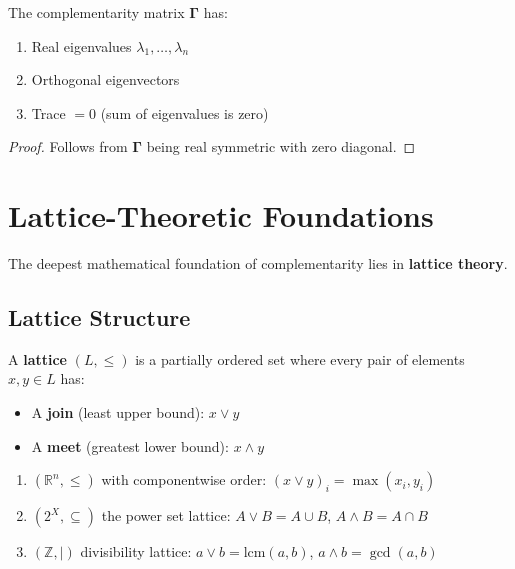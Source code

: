 \begin{theorem}
\label{thm:spectral}
The complementarity matrix $\boldsymbol{\Gamma}$ has:
\begin{enumerate}
    \item Real eigenvalues $\lambda_1, \ldots, \lambda_n$
    \item Orthogonal eigenvectors
    \item Trace $= 0$ (sum of eigenvalues is zero)
\end{enumerate}
\end{theorem}

\begin{proof}
Follows from $\boldsymbol{\Gamma}$ being real symmetric with zero diagonal.
\end{proof}

\section{Lattice-Theoretic Foundations}
\label{sec:lattice}

The deepest mathematical foundation of complementarity lies in \textbf{lattice theory}.

\subsection{Lattice Structure}

\begin{definition}[Lattice]
A \textbf{lattice} $(L, \leq)$ is a partially ordered set where every pair of elements $x, y \in L$ has:
\begin{itemize}
    \item A \textbf{join} (least upper bound): $x \vee y$
    \item A \textbf{meet} (greatest lower bound): $x \wedge y$
\end{itemize}
\end{definition}

\begin{example}
\begin{enumerate}
    \item $(\mathbb{R}^n, \leq)$ with componentwise order: $(x \vee y)_i = \max(x_i, y_i)$
    \item $(2^X, \subseteq)$ the power set lattice: $A \vee B = A \cup B$, $A \wedge B = A \cap B$
    \item $(\mathbb{Z}, |)$ divisibility lattice: $a \vee b = \text{lcm}(a,b)$, $a \wedge b = \gcd(a,b)$
\end{enumerate}
\end{example}

